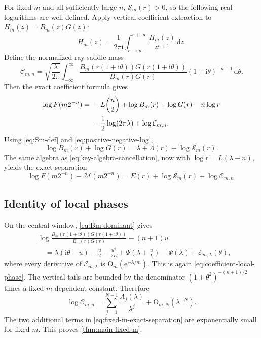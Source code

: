 \documentclass[11pt,oneside]{article}
\theoremstyle{definition}
\theoremstyle{remark}
\newcommand{\e}{\mathrm e}
\newcommand{\ii}{\mathrm i}
\newcommand{\dd}{\,\mathrm d}
\newcommand{\bigO}{\mathrm O}
\newcommand{\Mmain}{\mathcal M}
\newcommand{\CoeffMass}{\mathcal C}
\newcommand{\Prefix}{\mathcal S}
\begin{document}
For fixed $m$ and all sufficiently large $n$, $\Prefix_m(r)>0$, so the following real logarithms are well defined.  Apply vertical coefficient extraction to
$H_m(z)=B_m(z)G(z)$:
\begin{equation}
 [z^n]H_m(z)=
 \frac1{2\pi\ii}\int_{r-\ii\infty}^{r+\ii\infty}
 \frac{H_m(z)}{z^{n+1}}\dd z.
\label{eq:Hm-vertical}
\end{equation}
Define the normalized ray saddle mass
\begin{equation}
 \CoeffMass_{m,n}=
 \sqrt{\frac\lambda{2\pi}}
 \int_{-\infty}^{\infty}
 \frac{B_m(r(1+\ii\theta))G(r(1+\ii\theta))}
 {B_m(r)G(r)}
 (1+\ii\theta)^{-n-1}\dd\theta.
\label{eq:Cmn-def}
\end{equation}
Then the exact coefficient formula gives
\begin{align}
 \log F(m2^{-n})
 ={}&-L\binom n2+\log B_m(r)+\log G(r)-n\log r    \notag\\
 &-\frac12\log(2\pi\lambda)+\log\CoeffMass_{m,n}.
\label{eq:fixed-m-exact-log}
\end{align}
Using \eqref{eq:Sm-def} and \eqref{eq:positive-negative-log},
\begin{equation}
 \log B_m(r)+\log G(r)
 =\lambda+\Lambda(r)+\log\Prefix_m(r).
\label{eq:BmG-real}
\end{equation}
The same algebra as \eqref{eq:key-algebra-cancellation}, now with
$\log r=L(\lambda-n)$, yields the exact separation
\begin{equation}
 \boxed{
 \log F(m2^{-n})-\Mmain(m2^{-n})
 =E(r)+\log\Prefix_m(r)+\log\CoeffMass_{m,n}.}
\label{eq:fixed-m-exact-separation}
\end{equation}

\subsection{Identity of local phases}

On the central window, \eqref{eq:Bm-dominant} gives
\begin{align*}
 &\log\frac{B_m(r(1+\ii\theta))G(r(1+\ii\theta))}
 {B_m(r)G(r)}-(n+1)u\\
 &\quad=\lambda(\ii\theta-u)-\frac u2-\frac{u^2}{2L}
 +\Psi\!\left(\lambda+\frac uL\right)-\Psi(\lambda)
 +\mathcal E_{m,\lambda}(\theta),
\end{align*}
where every derivative of $\mathcal E_{m,\lambda}$ is
$\bigO_m(\e^{-\lambda/m})$.  This is again
\eqref{eq:coefficient-local-phase}.  The vertical tails are bounded by the denominator
$(1+\theta^2)^{-(n+1)/2}$ times a fixed $m$-dependent constant.  Therefore
\begin{equation}
 \log\CoeffMass_{m,n}=
 \sum_{j=1}^{N-1}\frac{A_j(\lambda)}{\lambda^j}
 +\bigO_{m,N}(\lambda^{-N}).
\label{eq:Cmn-all-orders}
\end{equation}
The two additional terms in \eqref{eq:fixed-m-exact-separation} are exponentially small for fixed $m$.  This proves \cref{thm:main-fixed-m}.
\end{document}
